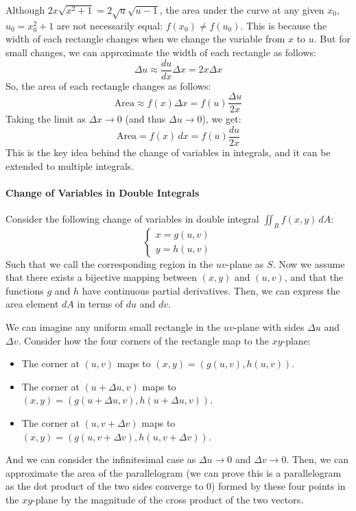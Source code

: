 \documentclass[11pt]{report}
\begin{document}
\begin{shaded}

    Although $2x \sqrt{x^2 + 1} = 2\sqrt{u} \sqrt{u-1}$, the area under the curve at any given $x_0$, $u_0 = x_0^2 + 1$ are not necessarily equal: $f(x_0) \neq f(u_0)$. This is because the width of each rectangle changes when we change the variable from $x$ to $u$. But for small changes, we can approximate the width of each rectangle as follows:
    $$        
    \Delta u \approx \frac{du}{dx} \Delta x = 2x \Delta x
    $$
    So, the area of each rectangle changes as follows:
    $$        
    \text{Area} \approx f(x) \Delta x = f(u) \frac{\Delta u}{2x}
    $$
    Taking the limit as $\Delta x \to 0$ (and thus $\Delta u \to 0$), we get:
    $$        
    \text{Area} = f(x) \, dx = f(u) \frac{du}{2x}
    $$
    This is the key idea behind the change of variables in integrals, and it can be extended to multiple integrals.
\end{shaded}

\paragraph{Change of Variables in Double Integrals} Consider the following change of variables in double integral $\iint_R f(x,y) \, dA$:
$$
\begin{cases}
    x = g(u,v) \\
    y = h(u,v)
\end{cases}
$$
Such that we call the corresponding region in the $uv$-plane as $S$. Now we assume that there exists a bijective mapping between $(x,y)$ and $(u,v)$, and that the functions $g$ and $h$ have continuous partial derivatives. Then, we can express the area element $dA$ in terms of $du$ and $dv$.

We can imagine any uniform small rectangle in the $uv$-plane with sides $\Delta u$ and $\Delta v$. Consider how the four corners of the rectangle map to the $xy$-plane:
\begin{itemize}
    \item The corner at $(u,v)$ maps to $(x,y) = (g(u,v), h(u,v))$.
    \item The corner at $(u + \Delta u, v)$ maps to $(x,y) = (g(u + \Delta u, v), h(u + \Delta u, v))$.
    \item The corner at $(u, v + \Delta v)$ maps to $(x,y) = (g(u, v + \Delta v), h(u, v + \Delta v))$.\end{itemize}
And we can consider the infinitesimal case as $\Delta u \to 0$ and $\Delta v \to 0$. Then, we can approximate the area of the parallelogram (we can prove this is a parallelogram as the dot product of the two sides converge to 0) formed by these four points in the $xy$-plane by the magnitude of the cross product of the two vectors. 
\end{document}
